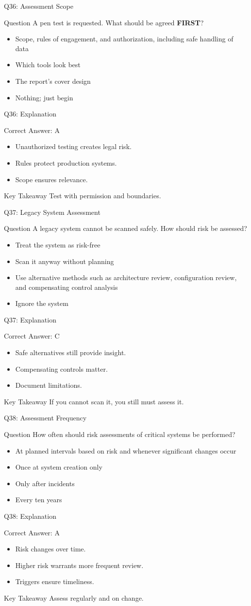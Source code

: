 \documentclass[aspectratio=169]{beamer}
\newcommand{\hq}[7]{%
	\begin{frame}{Q#1: #2}
		\begin{block}{Question}
			#3
		\end{block}
		\begin{itemize}
			#4
		\end{itemize}
	\end{frame}
	\begin{frame}{Q#1: Explanation}
		\begin{block}{Correct Answer: #5}
			\begin{itemize}
				#6
			\end{itemize}
		\end{block}
		\begin{alertblock}{Key Takeaway}
			#7
		\end{alertblock}
	\end{frame}
}
\begin{document}
	\hq{36}{Assessment Scope}
	{A pen test is requested. What should be agreed \textbf{FIRST}?}
	{\item[\textbf{(A)}] Scope, rules of engagement, and authorization, including safe handling of data
		\item[\textbf{(B)}] Which tools look best
		\item[\textbf{(C)}] The report's cover design
		\item[\textbf{(D)}] Nothing; just begin}
	{A}
	{\item Unauthorized testing creates legal risk.
		\item Rules protect production systems.
		\item Scope ensures relevance.}
	{Test with permission and boundaries.}
	
	\hq{37}{Legacy System Assessment}
	{A legacy system cannot be scanned safely. How should risk be assessed?}
	{\item[\textbf{(A)}] Treat the system as risk-free
		\item[\textbf{(B)}] Scan it anyway without planning
		\item[\textbf{(C)}] Use alternative methods such as architecture review, configuration review, and compensating control analysis
		\item[\textbf{(D)}] Ignore the system}
	{C}
	{\item Safe alternatives still provide insight.
		\item Compensating controls matter.
		\item Document limitations.}
	{If you cannot scan it, you still must assess it.}
	
	\hq{38}{Assessment Frequency}
	{How often should risk assessments of critical systems be performed?}
	{\item[\textbf{(A)}] At planned intervals based on risk and whenever significant changes occur
		\item[\textbf{(B)}] Once at system creation only
		\item[\textbf{(C)}] Only after incidents
		\item[\textbf{(D)}] Every ten years}
	{A}
	{\item Risk changes over time.
		\item Higher risk warrants more frequent review.
		\item Triggers ensure timeliness.}
	{Assess regularly and on change.}
	
\end{document}
